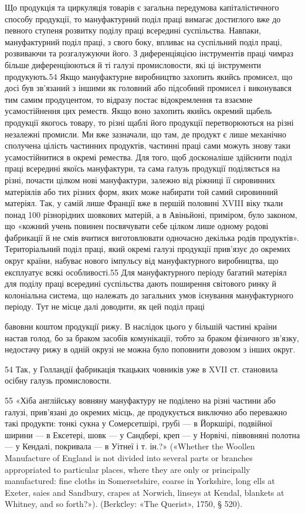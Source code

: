 Що продукція та циркуляція товарів є загальна передумова
капіталістичного способу продукції, то мануфактурний поділ
праці вимагає достиглого вже до певного ступеня розвитку поділу
праці всередині суспільства. Навпаки, мануфактурний поділ
праці, з свого боку, впливає на суспільний поділ праці, розвиваючи
та розгалужуючи його. З диференціяцією інструментів
праці чимраз більше диференціюються й ті галузі промисловости,
які ці інструменти продукують.54 Якщо мануфактурне виробництво
захопить якийсь промисел, що досі був зв’язаний з іншими
як головний або підсобний промисел і виконувався тим самим
продуцентом, то відразу постає відокремлення та взаємне усамостійнення
цих реместв. Якщо воно захопить якийсь окремий
щабель продукції якогось товару, то різні щаблі його продукції
перетворюються на різні незалежні промисли. Ми вже зазначали,
що там, де продукт є лише механічно сполучена цілість частинних
продуктів, частинні праці сами можуть знову таки усамостійнитися
в окремі ремества. Для того, щоб досконаліше здійснити
поділ праці всередині якоїсь мануфактури, та сама галузь
продукції поділяється на різні, почасти цілком нові мануфактури,
залежно від ріжниці її сировинних матеріялів або тих різних
форм, яких може набирати той самий сировинний матеріял.
Так, у самій лише Франції вже в першій половині XVIII віку
ткали понад 100 різнорідних шовкових матерій, а в Авіньйоні,
приміром, було законом, що «кожний учень повинен посвячувати
себе цілком лише одному родові фабрикації й не смів вчитися
виготовлювати одночасно декілька родів продуктів». Територіальний
поділ праці, який окремі галузі продукції прив’язує
до окремих округ країни, набуває нового імпульсу від мануфактурного
виробництва, що експлуатує всякі особливості.55 Для мануфактурного
періоду багатий матеріял для поділу праці всередині
суспільства дають поширення світового ринку й колоніальна
система, що належать до загальних умов існування мануфактурного
періоду. Тут не місце далі доводити, як цей поділ праці

бавовни коштом продукції рижу. В наслідок цього у більшій частині
країни настав голод, бо за браком засобів комунікації, тобто за браком
фізичного зв'язку, недостачу рижу в одній окрузі не можна було поповнити
довозом з інших округ.

54 Так, у Голландії фабрикація ткацьких човників уже в XVII ст.
становила осібну галузь промисловости.

55 «Хіба англійську вовняну мануфактуру не поділено на різні
частини або галузі, прив’язані до окремих місць, де продукується виключно
або переважно такі продукти: тонкі сукна у Сомерсетшірі, грубі —
в Йоркшірі, подвійної ширини — в Ексетері, шовк — у Сандбері, креп —
у Норвічі, піввовняні полотна — у Кендалі, покривала — в Уітнеї і
т. ін.?» («Whether the Woollen Manufacture of England is not divided
into several parts or branches appropriated to particular places, where
they are only or principally manufactured: fine cloths in Somersetshire,
coarse in Yorkshire, long ells at Exeter, saies and Sandbury, crapes at
Norwich, linseys at Kendal, blankets at Whitney, and so forth?»).
(Berkсley: «The Querist», 1750, § 520).
